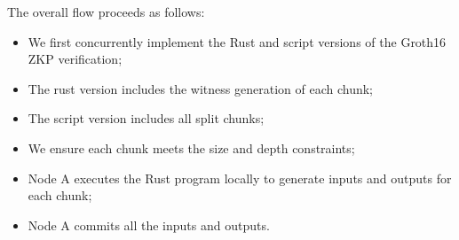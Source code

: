 The overall flow proceeds as follows:
\begin{itemize}
    \item We first concurrently implement the Rust and script versions of the Groth16 ZKP verification;
    \item The rust version includes the witness generation of each chunk;
    \item The script version includes all split chunks;
    \item We ensure each chunk meets the size and depth constraints;
    \item Node A executes the Rust program locally to generate inputs and outputs for each chunk;
    \item Node A commits all the inputs and outputs.
\end{itemize}
